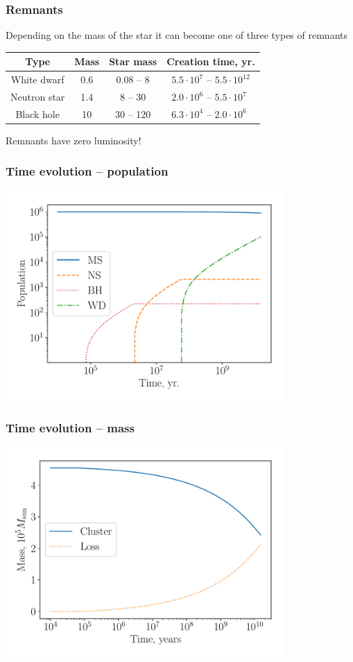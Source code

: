 \documentclass{beamer}
\begin{document}
\begin{frame}
\frametitle{Remnants}
Depending on the mass of the star it can become one of three types of
remnants

\begin{tabular}{c|ccc}
Type & Mass & Star mass& Creation time, yr.\\
\hline
White dwarf & 0.6 & 0.08 -- 8 & $5.5\cdot10^{7}$ -- $5.5\cdot10^{12}$\\
Neutron star & 1.4 & 8 -- 30 & $2.0\cdot10^{6}$ -- $5.5\cdot10^{7\phantom{0}}$ \\
Black hole & 10 & 30 -- 120 & $6.3\cdot10^{4}$ -- $2.0\cdot10^{6\phantom{0}}$
\end{tabular}

Remnants have zero luminosity!
\end{frame}

\begin{frame}
\frametitle{Time evolution -- population}
\includegraphics[width=0.8\textwidth]{remn.pdf}
\end{frame}

\begin{frame}
\frametitle{Time evolution -- mass}
\includegraphics[width=0.8\textwidth]{sm.pdf}
\end{frame}
\end{document}
